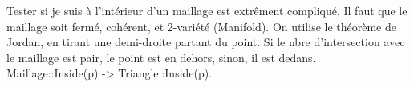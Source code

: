 \documentclass[11pt]{article}
\begin{document}
Tester si je suis à l'intérieur d'un maillage est extrêment compliqué. Il faut que le maillage soit fermé, cohérent, et 2-variété (Manifold). On utilise le théorème de Jordan, en tirant une demi-droite partant du point. Si le nbre d'intersection avec le maillage est pair, le point est en dehors, sinon, il est dedans. Maillage::Inside(p) -> Triangle::Inside(p).
\end{document}
